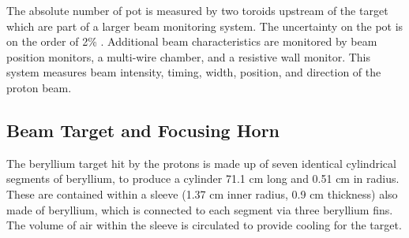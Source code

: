 The absolute number of \acrfull{pot} is measured by two toroids upstream of the target which are part of a larger beam monitoring system. The uncertainty on the \acrshort{pot} is on the order of 2\% \cite{miniboone_flux}. Additional beam characteristics are monitored by beam position monitors, a multi-wire chamber, and a resistive wall monitor.  This system measures beam intensity, timing, width, position, and direction of the proton beam.


\subsection{Beam Target and Focusing Horn}
\label{sec:target}

The beryllium target hit by the protons is made up of seven identical cylindrical segments of beryllium, to produce a cylinder 71.1 cm long and 0.51 cm in radius. These are contained within a sleeve (1.37 cm inner radius, 0.9 cm thickness) also made of beryllium, which is connected to each segment via three beryllium fins. The volume of air within the sleeve is circulated to provide cooling for the target.

